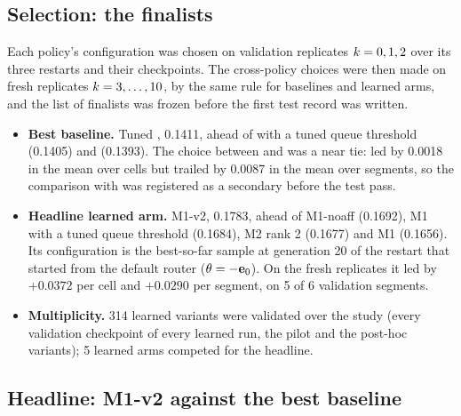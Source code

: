 \subsection{Selection: the finalists}
\label{sec:res-selection}

Each policy's configuration was chosen on validation replicates $k = 0,1,2$ over its three
restarts and their checkpoints. The cross-policy choices were then made on fresh replicates
$k = 3,\dots,10$, by the same rule for baselines and learned arms, and the list of finalists was
frozen before the first test record was written.
\begin{itemize}
  \item \textbf{Best baseline.} Tuned , 0.1411, ahead of  with a tuned
    queue threshold (0.1405) and  (0.1393). The choice between
     and  was a near tie:  led by 0.0018
    in the mean over cells but trailed by 0.0087 in the mean over segments, so the comparison with
     was registered as a secondary before the test pass.
  \item \textbf{Headline learned arm.} M1-v2, 0.1783, ahead of M1-noaff (0.1692), M1 with a tuned
    queue threshold (0.1684), M2 rank 2 (0.1677) and M1 (0.1656). Its configuration is the
    best-so-far sample at generation 20 of the restart that started from the default router
    ($\theta = -\mathbf{e}_{0}$). On the fresh replicates it led  by $+0.0372$ per cell and
    $+0.0290$ per segment, on 5 of 6 validation segments.
  \item \textbf{Multiplicity.} 314 learned variants were validated over the study (every
    validation checkpoint of every learned run, the pilot and the post-hoc variants); 5 learned arms
    competed for the headline.
\end{itemize}

\subsection{Headline: M1-v2 against the best baseline}
\label{sec:res-headline}

